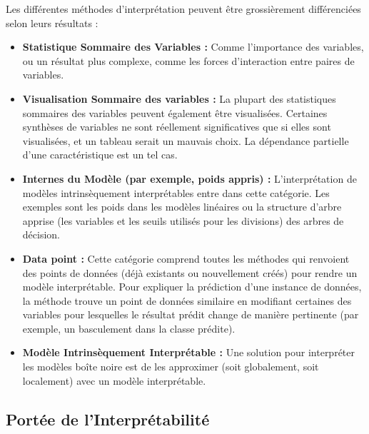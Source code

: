 Les différentes méthodes d'interprétation peuvent être grossièrement différenciées selon leurs résultats :

\begin{itemize}
    \item
    \textbf{Statistique Sommaire des Variables :} Comme l'importance des variables, ou un résultat plus complexe, comme les forces d'interaction entre paires de variables.

    \item
    \textbf{Visualisation Sommaire des variables :} La plupart des statistiques sommaires des variables peuvent également être visualisées. Certaines synthèses de variables ne sont réellement significatives que si elles sont visualisées, et un tableau serait un mauvais choix. La dépendance partielle d'une caractéristique est un tel cas.

    \item
    \textbf{Internes du Modèle (par exemple, poids appris) :} L'interprétation de modèles intrinsèquement interprétables entre dans cette catégorie. Les exemples sont les poids dans les modèles linéaires ou la structure d'arbre apprise (les variables et les seuils utilisés pour les divisions) des arbres de décision.

    \item
    \textbf{Data point :} Cette catégorie comprend toutes les méthodes qui renvoient des points de données (déjà existants ou nouvellement créés) pour rendre un modèle interprétable. Pour expliquer la prédiction d'une instance de données, la méthode trouve un point de données similaire en modifiant certaines des variables pour lesquelles le résultat prédit change de manière pertinente (par exemple, un basculement dans la classe prédite).

    \item
    \textbf{Modèle Intrinsèquement Interprétable :} Une solution pour interpréter les modèles boîte noire est de les approximer (soit globalement, soit localement) avec un modèle interprétable.
    
\end{itemize}

\subsection{Portée de l'Interprétabilité}

